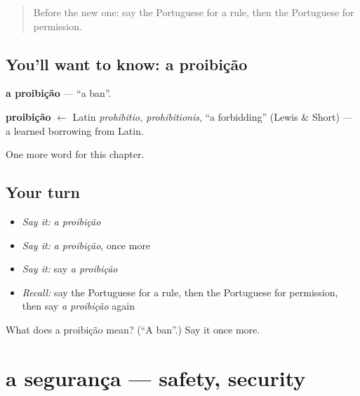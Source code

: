 \label{lesson:PT-C192-proibicao}



\begin{quote}
Before the new one: say the Portuguese for a rule, then the Portuguese for permission.
\end{quote}

\subsection*{You'll want to know: a proibição}
\textbf{a proibição} — \textquotedblleft{}a ban\textquotedblright{}.

\begin{cousinweb}
\textbf{proibição} $\leftarrow$ Latin \emph{prohibitio, prohibitionis}, \textquotedblleft{}a forbidding\textquotedblright{} (Lewis \& Short) — a learned borrowing from Latin.
\end{cousinweb}

\begin{grammarlens}[title={What you've built}]
One more word for this chapter.
\end{grammarlens}

\subsection*{Your turn}
\begin{itemize}
\raggedright
  \item \emph{Say it:} \emph{a proibição}
  \item \emph{Say it:} \emph{a proibição}, once more
  \item \emph{Say it:} say \emph{a proibição}
  \item \emph{Recall:} say the Portuguese for a rule, then the Portuguese for permission, then say \emph{a proibição} again
\end{itemize}

\begin{tcolorbox}[breakable,colback=teal!4,colframe=teal!35!black,title={Before you move on}]
What does a proibição mean? (\textquotedblleft{}A ban\textquotedblright{}.) Say it once more.
\end{tcolorbox}
\section[a segurança]{a segurança — safety, security}

\label{lesson:PT-C192-seguranca}



